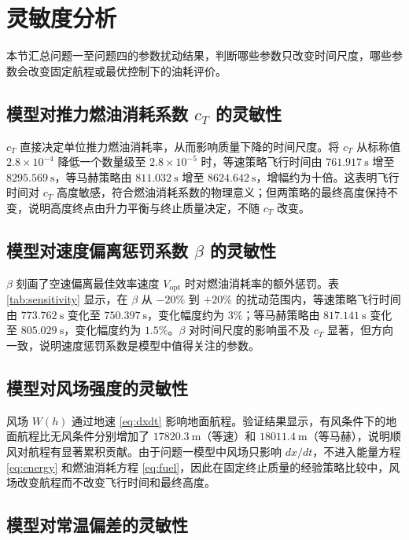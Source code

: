 \documentclass[withoutpreface,bwprint]{cumcmthesis}
\begin{document}
\section{灵敏度分析}

本节汇总问题一至问题四的参数扰动结果，判断哪些参数只改变时间尺度，哪些参数会改变固定航程或最优控制下的油耗评价。

\subsection{模型对推力燃油消耗系数 $c_T$ 的灵敏性}

$c_T$ 直接决定单位推力燃油消耗率，从而影响质量下降的时间尺度。将 $c_T$ 从标称值 $2.8\times 10^{-4}$ 降低一个数量级至 $2.8\times 10^{-5}$ 时，等速策略飞行时间由 $761.917\ \mathrm{s}$ 增至 $8295.569\ \mathrm{s}$，等马赫策略由 $811.032\ \mathrm{s}$ 增至 $8624.642\ \mathrm{s}$，增幅约为十倍。这表明飞行时间对 $c_T$ 高度敏感，符合燃油消耗系数的物理意义；但两策略的最终高度保持不变，说明高度终点由升力平衡与终止质量决定，不随 $c_T$ 改变。

\subsection{模型对速度偏离惩罚系数 $\beta$ 的灵敏性}

$\beta$ 刻画了空速偏离最佳效率速度 $V_{\mathrm{opt}}$ 时对燃油消耗率的额外惩罚。表 \ref{tab:sensitivity} 显示，在 $\beta$ 从 $-20\%$ 到 $+20\%$ 的扰动范围内，等速策略飞行时间由 $773.762\ \mathrm{s}$ 变化至 $750.397\ \mathrm{s}$，变化幅度约为 $3\%$；等马赫策略由 $817.141\ \mathrm{s}$ 变化至 $805.029\ \mathrm{s}$，变化幅度约为 $1.5\%$。$\beta$ 对时间尺度的影响虽不及 $c_T$ 显著，但方向一致，说明速度惩罚系数是模型中值得关注的参数。

\subsection{模型对风场强度的灵敏性}

风场 $W(h)$ 通过地速 \eqref{eq:dxdt} 影响地面航程。验证结果显示，有风条件下的地面航程比无风条件分别增加了 $17820.3\ \mathrm{m}$（等速）和 $18011.4\ \mathrm{m}$（等马赫），说明顺风对航程有显著累积贡献。由于问题一模型中风场只影响 $dx/dt$，不进入能量方程 \eqref{eq:energy} 和燃油消耗方程 \eqref{eq:fuel}，因此在固定终止质量的经验策略比较中，风场改变航程而不改变飞行时间和最终高度。

\subsection{模型对常温偏差的灵敏性}
\end{document}
